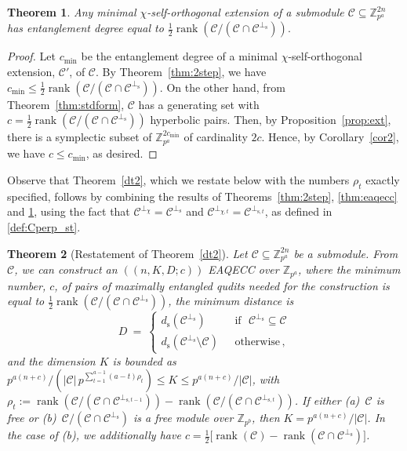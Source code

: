 \documentclass{article}
\DeclareMathOperator{\rank}{rank}
\def\Z{\mathbb{Z}}
\newtheorem{thm}{Theorem}[section]
\theoremstyle{remark}
\theoremstyle{definition}
\numberwithin{equation}{section}
\begin{document}
\begin{thm}\label{4thm} Any minimal $\chi$-self-orthogonal extension of a submodule $\mathcal{C} \subseteq \mathbb{Z}_{p^a}^{2n}$ has entanglement degree equal to $\frac12 \rank(\mathcal{C}/(\mathcal{C} \cap \mathcal{C}^{\perp_{\mathrm{s}}})).$
\end{thm}
\begin{proof} 
Let $c_{\min}$ be the entanglement degree of a minimal $\chi$-self-orthogonal extension, $\mathcal{C}'$, of $\mathcal{C}$. By Theorem~\ref{thm:2step}, we have $c_{\min} \le  \frac12 \rank(\mathcal{C}/(\mathcal{C} \cap \mathcal{C}^{\perp_{\mathrm{s}}})) $. On the other hand, from Theorem~\ref{thm:stdform}, $\mathcal{C}$ has a generating set with $c = \frac12 \rank(\mathcal{C}/(\mathcal{C} \cap \mathcal{C}^{\perp_{\mathrm{s}}}))$ hyperbolic pairs. Then, by Proposition~\ref{prop:ext}, there is a symplectic subset of $\mathbb{Z}_{p^a}^{2c_{\min}}$ of cardinality $2c$. Hence, by Corollary~\ref{cor2}, we have $c \le c_{\min}$, as desired.
\end{proof}

Observe that Theorem~\ref{dt2}, which we restate below with the numbers $\rho_t$ exactly specified,  follows by combining the results of Theorems~\ref{thm:2step}, \ref{thm:eaqecc} and \ref{4thm}, using the fact that $\mathcal{C}^{\perp_\chi}=\mathcal{C}^{\perp_{\mathrm{s}}}$ and  $\mathcal{C}^{\perp_{\chi,t}}=\mathcal{C}^{\perp_{\mathrm{s},t}}$, as defined in \eqref{def:Cperp_st}.

\begin{thm}[Restatement of Theorem~\ref{dt2}] Let  $\mathcal{C} \subseteq \mathbb{Z}_{p^a}^{2n}$ be a submodule. From $\mathcal{C}$, we can construct an $((n,K, D; c))$ EAQECC over $\Z_{p^a}$, where the minimum number, $c$, of pairs of maximally entangled qudits needed for the construction is equal to $\frac12 \rank(\mathcal{C}/(\mathcal{C} \cap \mathcal{C}^{\perp_{\mathrm{s}}}))$,  the minimum distance is 
\begin{equation*}
D~=~\left\{\begin{array}{ll}
d_{\mathrm{s}}(\mathcal{C}^{\perp_{\mathrm{s}}}) & \text{~~if~~} \mathcal{C}^{\perp_{\mathrm{s}}} \subseteq \mathcal{C} \\  
d_{\mathrm{s}}(\mathcal{C}^{\perp_{\mathrm{s}}}\setminus \mathcal{C} )  & \text{~~otherwise} \, , \end{array}\right. 
\end{equation*}
and the dimension $K$ is bounded as $p^{a(n+c)}/ (|\mathcal{C}| \, {p^{\sum_{t=1}^{a-1} (a-t)\rho_t}}) \leq  K \leq p^{a(n+c)}/|\mathcal{C}|$, with $\rho_t:=\rank(\mathcal{C}/(\mathcal{C} \cap \mathcal{C}^{\perp_{\mathrm{s},t-1}}))-\rank(\mathcal{C}/(\mathcal{C} \cap \mathcal{C}^{\perp_{\mathrm{s},t}}))$.  If either \emph{(a)}~$\mathcal{C}$ is free or \emph{(b)}~$\mathcal{C}/(\mathcal{C} \cap \mathcal{C}^{\perp_{\mathrm{s}}})$ is a free module over $\mathbb{Z}_{p^b}$, then $K = p^{a(n+c)}/|\mathcal{C}|$. In the case of \emph{(b)}, we additionally have $c=\frac12 \bigl[\rank(\mathcal{C}) - \rank(\mathcal{C} \cap \mathcal{C}^{\perp_{\mathrm{s}}})\bigr]$.
 \end{thm}
\end{document}
